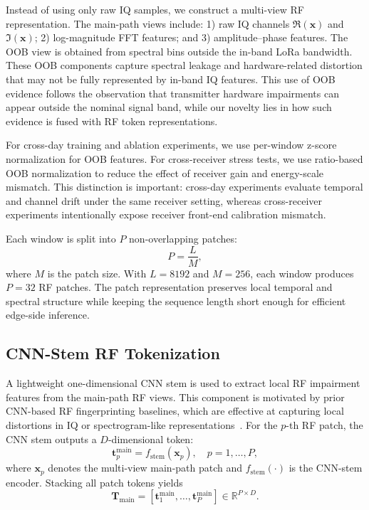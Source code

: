 Instead of using only raw IQ samples, we construct a multi-view RF representation. The main-path views include: 1) raw IQ channels $\Re(\mathbf{x})$ and $\Im(\mathbf{x})$; 2) log-magnitude FFT features; and 3) amplitude--phase features. The OOB view is obtained from spectral bins outside the in-band LoRa bandwidth. These OOB components capture spectral leakage and hardware-related distortion that may not be fully represented by in-band IQ features. This use of OOB evidence follows the observation that transmitter hardware impairments can appear outside the nominal signal band, while our novelty lies in how such evidence is fused with RF token representations.

For cross-day training and ablation experiments, we use per-window z-score normalization for OOB features. For cross-receiver stress tests, we use ratio-based OOB normalization to reduce the effect of receiver gain and energy-scale mismatch. This distinction is important: cross-day experiments evaluate temporal and channel drift under the same receiver setting, whereas cross-receiver experiments intentionally expose receiver front-end calibration mismatch.

Each window is split into $P$ non-overlapping patches:
\begin{equation}
    P = \frac{L}{M},
\end{equation}
where $M$ is the patch size. With $L=8192$ and $M=256$, each window produces $P=32$ RF patches. The patch representation preserves local temporal and spectral structure while keeping the sequence length short enough for efficient edge-side inference.

\subsection{CNN-Stem RF Tokenization}

A lightweight one-dimensional CNN stem is used to extract local RF impairment features from the main-path RF views. This component is motivated by prior CNN-based RF fingerprinting baselines, which are effective at capturing local distortions in IQ or spectrogram-like representations~\cite{jian2020deeplearning_rf_fingerprinting,shen2021lora_spectrogram_cnn}. For the $p$-th RF patch, the CNN stem outputs a $D$-dimensional token:
\begin{equation}
    \mathbf{t}^{\mathrm{main}}_p = f_{\mathrm{stem}}(\mathbf{x}_p),
    \quad p=1,\ldots,P,
\end{equation}
where $\mathbf{x}_p$ denotes the multi-view main-path patch and $f_{\mathrm{stem}}(\cdot)$ is the CNN-stem encoder. Stacking all patch tokens yields
\begin{equation}
    \mathbf{T}_{\mathrm{main}}
    =
    [\mathbf{t}^{\mathrm{main}}_1,\ldots,\mathbf{t}^{\mathrm{main}}_P]
    \in \mathbb{R}^{P \times D}.
\end{equation}

